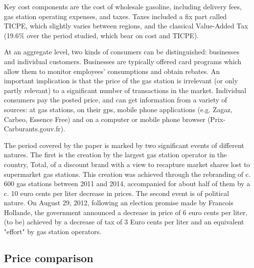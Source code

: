 \documentclass[english]{article}
\begin{document}
Key cost components are the cost of wholesale gasoline, including delivery fees,  gas station operating expenses, and taxes. Taxes included a fix part called TICPE, which slightly varies between regions, and the classical Value-Added Tax (19.6\% over the period studied, which bear on cost and TICPE).

At an aggregate level, two kinds of consumers can be distinguished: businesses and individual customers. Businesses are typically offered card programs which allow them to monitor employees' consumptions and obtain rebates. An important implication is that the price of the gas station is irrelevant (or only partly relevant) to a significant number of transactions in the market. Individual consumers pay the posted price, and can get information from a variety of sources: at gas stations, on their gps, mobile phone applications (e.g. Zagaz, Carbeo, Essence Free) and on a computer or mobile phone browser (Prix-Carburants.gouv.fr).

The period covered by the paper is marked by two significant events of different natures. The first is the creation by the largest gas station operator in the country, Total, of a discount brand with a view to recapture market shares lost to supermarket gas stations. This creation was achieved through the rebranding of c. 600 gas stations between 2011 and 2014, accompanied for about half of them by a c. 10 euro cents per liter decrease in prices. The second event is of political nature. On August 29, 2012, following an election promise made by Francois Hollande, the government announced a decrease in price of 6 euro cents per liter, (to be) achieved by a decrease of tax of 3 Euro cents per liter and an equivalent "effort" by gas station operators.

\subsection{Price comparison}
\end{document}
